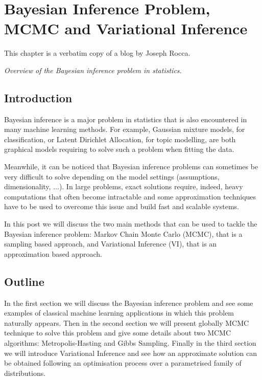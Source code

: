 
\chapter{Bayesian Inference Problem, MCMC and Variational Inference}
\label{chap:BayesianInferenceIroblemMCMCandVariationalInference}

This chapter is a verbatim copy of a blog \cite{JosephRoccaBayes2019} by Joseph Rocca.

\textit{Overview of the Bayesian inference problem in statistics.}

\section{Introduction}

Bayesian inference is a major problem in statistics that is also encountered in many machine learning methods. For example, Gaussian mixture models, for classification, or Latent Dirichlet Allocation, for topic modelling, are both graphical models requiring to solve such a problem when fitting the data.

Meanwhile, it can be noticed that Bayesian inference problems can sometimes be very difficult to solve depending on the model settings (assumptions, dimensionality, $\ldots$). In large problems, exact solutions require, indeed, heavy computations that often become intractable and some approximation techniques have to be used to overcome this issue and build fast and scalable systems.

In this post we will discuss the two main methods that can be used to tackle the Bayesian inference problem: Markov Chain Monte Carlo (MCMC), that is a sampling based approach, and Variational Inference (VI), that is an approximation based approach.

\section{Outline}

In the first section we will discuss the Bayesian inference problem and see some examples of classical machine learning applications in which this problem naturally appears. Then in the second section we will present globally MCMC technique to solve this problem and give some details about two MCMC algorithms: Metropolis-Hasting and Gibbs Sampling. Finally in the third section we will introduce Variational Inference and see how an approximate solution can be obtained following an optimisation process over a parametrised family of distributions.

